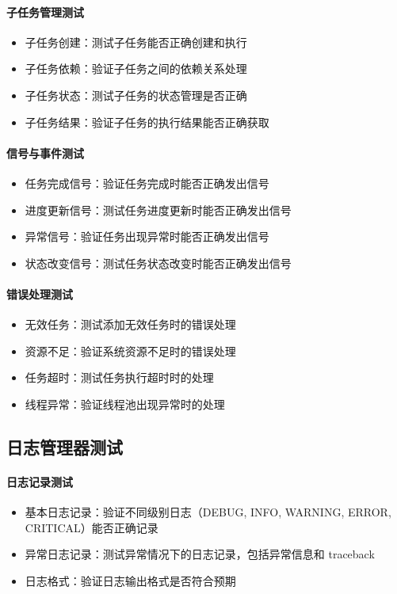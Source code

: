 \documentclass[a4paper,12pt]{report}	%
\begin{document}
\paragraph{子任务管理测试}
\begin{itemize}
    \item 子任务创建：测试子任务能否正确创建和执行
    \item 子任务依赖：验证子任务之间的依赖关系处理
    \item 子任务状态：测试子任务的状态管理是否正确
    \item 子任务结果：验证子任务的执行结果能否正确获取
\end{itemize}

\paragraph{信号与事件测试}
\begin{itemize}
    \item 任务完成信号：验证任务完成时能否正确发出信号
    \item 进度更新信号：测试任务进度更新时能否正确发出信号
    \item 异常信号：验证任务出现异常时能否正确发出信号
    \item 状态改变信号：测试任务状态改变时能否正确发出信号
\end{itemize}

\paragraph{错误处理测试}
\begin{itemize}
    \item 无效任务：测试添加无效任务时的错误处理
    \item 资源不足：验证系统资源不足时的错误处理
    \item 任务超时：测试任务执行超时时的处理
    \item 线程异常：验证线程池出现异常时的处理
\end{itemize}


\subsection{日志管理器测试}

\paragraph{日志记录测试}
\begin{itemize}
    \item 基本日志记录：验证不同级别日志（DEBUG, INFO, WARNING, ERROR, CRITICAL）能否正确记录
    \item 异常日志记录：测试异常情况下的日志记录，包括异常信息和 traceback
    \item 日志格式：验证日志输出格式是否符合预期
\end{itemize}
\end{document}
